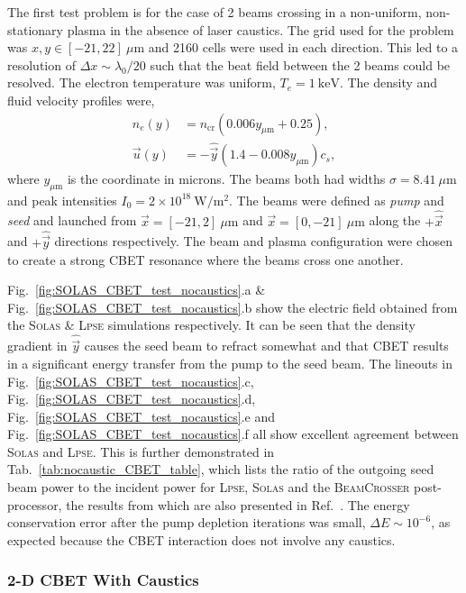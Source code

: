 The first test problem is for the case of 2 beams crossing in a non-uniform, non-stationary plasma in the absence of laser caustics.
The grid used for the problem was $x,y \in [-21,22]\ \mu\text{m}$ and 2160 cells were used in each direction.
This led to a resolution of $\Delta x\sim \lambda_0/20$ such that the beat field between the 2 beams could be resolved.
The electron temperature was uniform, $T_e=1\ \text{keV}$.
The density and fluid velocity profiles were,
\begin{align}
    n_e(y) &= n_{\text{cr}} (0.006y_{\mu\text{m}} + 0.25), \\
    \vec{u}(y) &= -\hat{\vec{y}}(1.4-0.008y_{\mu\text{m}})c_s,
\end{align}
where $y_{\mu\text{m}}$ is the coordinate in microns.
The beams both had widths $\sigma=8.41\ \mu\text{m}$ and peak intensities $I_0 = 2\times 10^{18}\ \text{W}/\text{m}^{2}$.
The beams were defined as \textit{pump} and \textit{seed} and launched from $\vec{x} = [-21,2]\ \mu\text{m}$ and $\vec{x} = [0,-21]\ \mu\text{m}$ along the $+\hat{\vec{x}}$ and $+\hat{\vec{y}}$ directions respectively.
The beam and plasma configuration were chosen to create a strong \ac{CBET} resonance where the beams cross one another.

Fig.~\ref{fig:SOLAS_CBET_test_nocaustics}.a \& Fig.~\ref{fig:SOLAS_CBET_test_nocaustics}.b show the electric field obtained from the \textsc{Solas} \& \textsc{Lpse} simulations respectively.
It can be seen that the density gradient in $\hat{\vec{y}}$ causes the seed beam to refract somewhat and that \ac{CBET} results in a significant energy transfer from the pump to the seed beam.
The lineouts in Fig.~\ref{fig:SOLAS_CBET_test_nocaustics}.c, Fig.~\ref{fig:SOLAS_CBET_test_nocaustics}.d, Fig.~\ref{fig:SOLAS_CBET_test_nocaustics}.e and Fig.~\ref{fig:SOLAS_CBET_test_nocaustics}.f all show excellent agreement between \textsc{Solas} and \textsc{Lpse}.
This is further demonstrated in Tab.~\ref{tab:nocaustic_CBET_table}, which lists the ratio of the outgoing seed beam power to the incident power for \textsc{Lpse}, \textsc{Solas} and the \textsc{BeamCrosser} post-processor, the results from which are also presented in Ref.~\cite{follett_validation_2022}.
The energy conservation error after the pump depletion iterations was small, $\Delta E \sim 10^{-6}$, as expected because the \ac{CBET} interaction does not involve any caustics.

\subsubsection{2-D CBET With Caustics}%
\label{sec:SOLAS_CBET_caustic_test}

